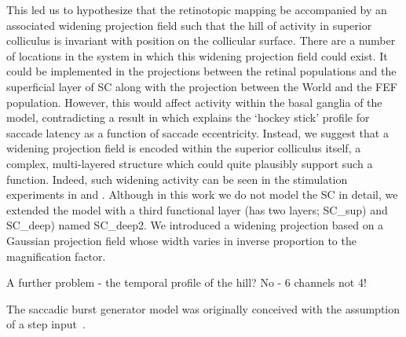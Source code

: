 \documentclass{frontiersSCNS}
\begin{document}
This led us to hypothesize that the retinotopic mapping be accompanied
by an associated widening projection field such that the hill of
activity in superior colliculus is invariant with position on the
collicular surface. There are a number of locations in the system in
which this widening projection field could exist. It could be
implemented in the projections between the retinal populations and the
superficial layer of SC along with the projection between the World
and the FEF population. However, this would affect activity within the
basal ganglia of the model, contradicting a result
in \cite{cope_basal_2017} which explains the `hockey stick' profile
for saccade latency as a function of saccade eccentricity. Instead, we
suggest that a widening projection field is encoded within the
superior colliculus itself, a complex, multi-layered structure which
could quite plausibly support such a function. Indeed, such widening
activity can be seen in the stimulation experiments
in \cite{vokoun_intralaminar_2010}
and \cite{vokoun_response_2014}. Although in this work we do not model
the SC in detail, we extended the model with a third functional layer
(\ccg has two layers; SC\_sup) and SC\_deep) named SC\_deep2. We
introduced a widening projection based on a Gaussian projection field
whose width varies in inverse proportion to the magnification factor.

A further problem - the temporal profile of the hill? No - 6 channels
not 4!

The saccadic burst generator model was originally conceived with the
assumption of a step input~\cite{gancarz_neural_1998}.
\end{document}
